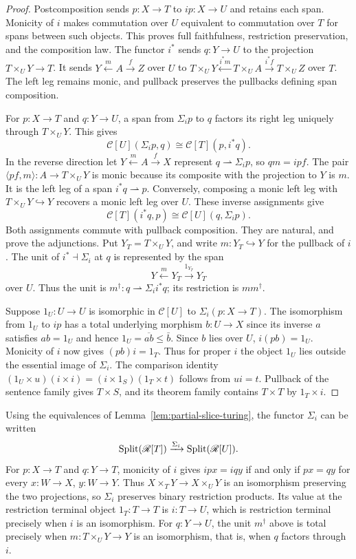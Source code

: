 \begin{proof}
Postcomposition sends $p:X\to T$ to $ip:X\to U$ and retains each
span. Monicity of $i$ makes commutation over $U$ equivalent to
commutation over $T$ for spans between such objects. This proves full
faithfulness, restriction preservation, and the composition law.
The functor $i^*$ sends $q:Y\to U$ to the projection $T\times_U Y\to T$.
It sends $Y\xleftarrow{m}A\xrightarrow{f}Z$ over $U$ to
$T\times_UY\xleftarrow{i^*m}T\times_UA\xrightarrow{i^*f}T\times_UZ$
over $T$. The left leg remains monic, and pullback preserves the pullbacks
defining span composition.

For $p:X\to T$ and $q:Y\to U$, a span from $\Sigma_i p$ to $q$
factors its right leg uniquely through $T\times_UY$. This gives
\[
 \mathscr C[U](\Sigma_i p,q)\cong\mathscr C[T](p,i^*q).
\]
In the reverse direction let $Y\xleftarrow{m}A\xrightarrow{f}X$
represent $q\rightharpoonup\Sigma_i p$, so $qm=ipf$.
The pair $\langle pf,m\rangle:A\to T\times_UY$ is monic because its
composite with the projection to $Y$ is $m$. It is the left leg of a
span $i^*q\rightharpoonup p$. Conversely, composing a monic left leg
with $T\times_UY\hookrightarrow Y$ recovers a monic left leg over $U$.
These inverse assignments give
\[
 \mathscr C[T](i^*q,p)\cong\mathscr C[U](q,\Sigma_i p).
\]
Both assignments commute with pullback composition. They are natural,
and prove the adjunctions. Put $Y_T=T\times_U Y$, and write
$m:Y_T\hookrightarrow Y$ for the pullback of $i$. The unit of
$i^*\dashv\Sigma_i$ at $q$ is represented by the span
\[
 Y\xleftarrow{m}Y_T\xrightarrow{1_{Y_T}}Y_T
\]
over $U$. Thus the unit is $m^\dagger:q\rightharpoonup\Sigma_i i^*q$;
its restriction is $mm^\dagger$.

Suppose $1_U:U\to U$ is isomorphic in $\mathscr C[U]$ to
$\Sigma_i(p:X\to T)$. The isomorphism from $1_U$ to $ip$ has a
total underlying morphism $b:U\to X$ since its inverse $a$ satisfies
$ab=1_U$ and hence $1_U=\overline{ab}\leq\bar b$. Since $b$ lies
over $U$, $i(pb)=1_U$. Monicity of $i$ now gives $(pb)i=1_T$.
Thus for proper $i$ the object $1_U$ lies outside the essential
image of $\Sigma_i$.
The comparison identity
$(1_U\times u)(i\times i)=(i\times1_S)(1_T\times t)$
follows from $ui=t$. Pullback of the sentence family gives $T\times S$,
and its theorem family contains $T\times T$ by $1_T\times i$.
\end{proof}

Using the equivalences of Lemma~\ref{lem:partial-slice-turing},
the functor $\Sigma_i$ can be written
\[
 \operatorname{Split}(\mathscr R[T])\xrightarrow{\Sigma_i}\operatorname{Split}(\mathscr R[U]).
\]
For $p:X\to T$ and $q:Y\to T$, monicity of $i$ gives
$ipx=iqy$ if and only if $px=qy$ for every $x:W\to X$, $y:W\to Y$.
Thus $X\times_T Y\to X\times_U Y$ is an isomorphism preserving the
two projections, so $\Sigma_i$ preserves binary restriction products.
Its value at the restriction terminal object $1_T:T\to T$ is $i:T\to U$,
which is restriction terminal precisely when $i$ is an isomorphism.
For $q:Y\to U$, the unit $m^\dagger$ above is total precisely when
$m:T\times_UY\to Y$ is an isomorphism, that is, when $q$ factors through $i$.

